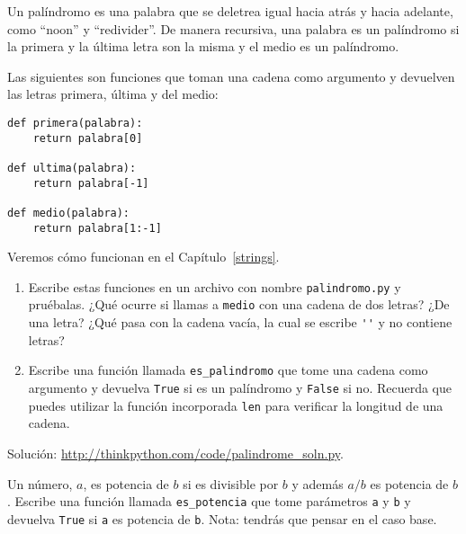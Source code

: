 \documentclass[10pt]{book}
\begin{document}
\begin{exercise}
\label{palindrome}

Un palíndromo es una palabra que se deletrea igual hacia atrás y
hacia adelante, como ``noon'' y ``redivider''.  De manera recursiva, una palabra
es un palíndromo si la primera y la última letra son la misma
y el medio es un palíndromo.

Las siguientes son funciones que toman una cadena como argumento y
devuelven las letras primera, última y del medio:

\begin{verbatim}
def primera(palabra):
    return palabra[0]

def ultima(palabra):
    return palabra[-1]

def medio(palabra):
    return palabra[1:-1]
\end{verbatim}
%
Veremos cómo funcionan en el Capítulo~\ref{strings}.

\begin{enumerate}

\item Escribe estas funciones en un archivo con nombre {\tt palindromo.py}
y pruébalas.  ¿Qué ocurre si llamas a {\tt medio} con
una cadena de dos letras?  ¿De una letra?  ¿Qué pasa con la cadena
vacía, la cual se escribe \verb"''" y no contiene letras?

\item Escribe una función llamada \verb"es_palindromo" que tome
una cadena como argumento y devuelva {\tt True} si es un palíndromo
y {\tt False} si no.  Recuerda que puedes utilizar la
función incorporada {\tt len} para verificar la longitud de una cadena.

\end{enumerate}

Solución: \url{http://thinkpython.com/code/palindrome_soln.py}.

\end{exercise}

\begin{exercise}

Un número, $a$, es potencia de $b$ si es divisible por $b$
y además $a/b$ es potencia de $b$.  Escribe una función llamada
\verb"es_potencia" que tome parámetros {\tt a} y {\tt b}
y devuelva {\tt True} si {\tt a} es potencia de {\tt b}.
Nota: tendrás que pensar en el caso base.

\end{exercise}
\end{document}
